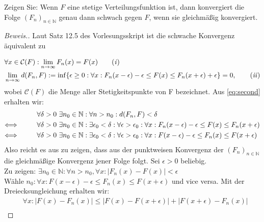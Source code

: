 \begin{lemma}
    Zeigen Sie: Wenn $F$ eine stetige Verteilungsfunktion ist, dann konvergiert die Folge $(F_n)_{n \in \mathbb{N}}$ genau dann
    schwach gegen $F$, wenn sie gleichmäßig konvergiert.
\end{lemma}
\begin{proof}[Beweis.]
    Laut Satz 12.5 des Vorlesungsskript ist die schwache Konvergenz äquivalent zu

    \begin{align*}
    &\forall x \in \mathcal{C}(F): \lim_{n \rightarrow \infty} F_n(x) = F(x) \tag{\textit{i}} \label{eq:first} \\
    &\lim_{n \rightarrow \infty} d(F_n,F) := \inf \{\epsilon \geq 0: \forall x: F_n(x - \epsilon) - \epsilon \leq F(x) \leq F_n(x + \epsilon) + \epsilon\} = 0, \tag{\textit{ii}} \label{eq:second} \\
\end{align*}
    wobei $\mathcal{C}(F)$ die Menge aller Stetigkeitspunkte von F bezeichnet.
    Aus \ref{eq:second} erhalten wir:
\begin{align*}
    &\forall \delta > 0~ \exists n_0 \in \mathbb{N}: \forall n > n_0: d(F_n,F) < \delta\\
    \Longleftrightarrow \hspace{10mm} &\forall \delta > 0~ \exists n_0 \in \mathbb{N}: \exists \epsilon_0 < \delta: \forall \epsilon > \epsilon_0: \forall x: F_n(x - \epsilon) - \epsilon \leq F(x) \leq F_n(x + \epsilon) \\
    \Longleftrightarrow \hspace{10mm} &\forall \delta > 0~ \exists n_0 \in \mathbb{N}: \exists \epsilon_0 < \delta: \forall \epsilon > \epsilon_0: \forall x: F(x - \epsilon) - \epsilon \leq F_n(x) \leq F(x + \epsilon) \\
\end{align*}
Also reicht es aus zu zeigen, dass aus der punktweisen Konvergenz der $(F_n)_{n \in \mathbb{N}}$ die gleichmäßige Konvergenz jener Folge folgt.
Sei $\epsilon > 0$ beliebig. \\
Zu zeigen: $\exists n_0 \in \mathbb{N}: \forall n > n_0, \forall x: | F_n(x) - F(x) | < \epsilon $\\
Wähle $n_0: \forall x: F(x - \epsilon) - \epsilon \leq F_n(x) \leq F(x + \epsilon) $ und vice versa.
Mit der Dreiecksungleichung erhalten wir:
\begin{align*}
  &\forall x: | F(x) - F_n(x)| \leq | F(x) - F(x + \epsilon) | + | F(x + \epsilon) - F_n(x) | \\

\end{align*}
\end{proof}
